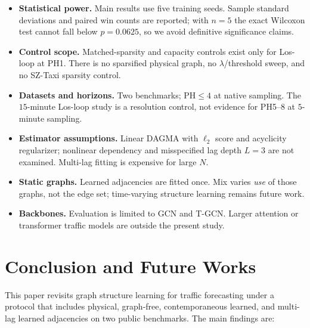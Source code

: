 \begin{itemize}
\item \textbf{Statistical power.} Main results use five training seeds.
Sample standard deviations and paired win counts are reported; with $n=5$
the exact Wilcoxon test cannot fall below $p=0.0625$, so we avoid definitive
significance claims.
\item \textbf{Control scope.} Matched-sparsity and capacity controls exist
only for Los-loop at PH1. There is no sparsified physical graph, no
$\lambda$/threshold sweep, and no SZ-Taxi sparsity control.
\item \textbf{Datasets and horizons.} Two benchmarks; $\mathrm{PH}\le 4$ at
native sampling. The $15$-minute Los-loop study is a resolution control, not
evidence for PH5--8 at $5$-minute sampling.
\item \textbf{Estimator assumptions.} Linear DAGMA with $\ell_2$ score and
acyclicity regularizer; nonlinear dependency and misspecified lag depth
$L=3$ are not examined. Multi-lag fitting is expensive for large $N$.
\item \textbf{Static graphs.} Learned adjacencies are fitted once. Mix
varies \emph{use} of those graphs, not the edge set; time-varying structure
learning remains future work.
\item \textbf{Backbones.} Evaluation is limited to GCN and T-GCN. Larger
attention or transformer traffic models are outside the present study.
\end{itemize}

\section{Conclusion and Future Works}\label{sec:conclusion}

This paper revisits graph structure learning for traffic forecasting under
a protocol that includes physical, graph-free, contemporaneous learned, and
multi-lag learned adjacencies on two public benchmarks. The main findings
are:

